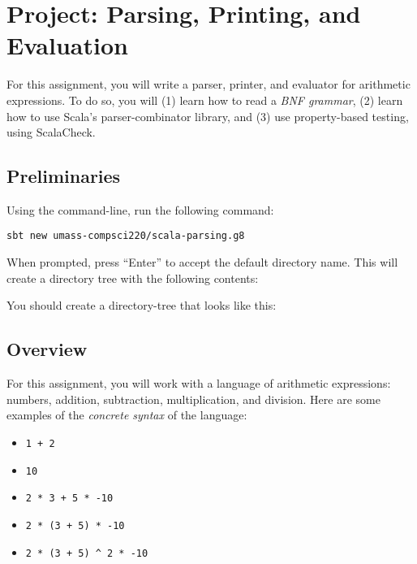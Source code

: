 \documentclass[9pt]{extbook}
\begin{document}


\chapter{Project: Parsing, Printing, and Evaluation}

For this assignment, you will write a parser, printer, and evaluator for 
arithmetic expressions.  To do so, you will (1) learn how to read a 
\emph{BNF grammar}, (2) learn how to use Scala's parser-combinator library, and 
(3) use property-based testing, using ScalaCheck.

\section{Preliminaries}

Using the command-line, run the following command:

\begin{lstlisting}
sbt new umass-compsci220/scala-parsing.g8
\end{lstlisting}

When prompted, press ``Enter'' to accept the default directory name. This will
create a directory tree with the following contents:

You should create a directory-tree that looks like this:


\section{Overview}

For this assignment, you will work with a language of arithmetic expressions: 
numbers, addition, subtraction, multiplication, and division. Here are some
examples of the \emph{concrete syntax} of the language:

\begin{itemize}
  \item \texttt{1 + 2}
  \item \texttt{10}
  \item \texttt{2 * 3 + 5 * -10}
  \item \texttt{2 * (3 + 5) * -10}
  \item \verb|2 * (3 + 5) ^ 2 * -10|
\end{itemize}
\end{document}
